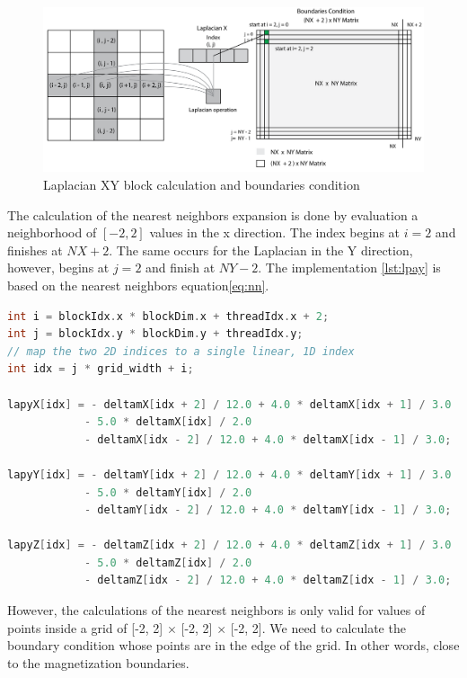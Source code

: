 \begin{figure}[htbp]
	\centering
		\includegraphics[width=1.0\textwidth]{Figures/laplacian.png}
		\smallskip
	\caption[Laplacian block calculation]{Laplacian XY block calculation and boundaries condition}
	\label{fig:laplacian}
\end{figure}

The calculation of the nearest neighbors expansion is done by evaluation a neighborhood of $[-2, 2]$ values in the x direction. The index begins at $i = 2$ and finishes at $NX + 2$. The same occurs for the Laplacian in the Y direction, however, begins at $j = 2$ and finish at $NY -2$.  The implementation \ref{lst:lpay} is based on the nearest neighbors equation\ref{eq:nn}.

\begin{lstlisting}[language=C++, label={lst:lpay}, caption={Laplacian evaluation for x, y and z coordinate}]
int i = blockIdx.x * blockDim.x + threadIdx.x + 2;
int j = blockIdx.y * blockDim.y + threadIdx.y;
// map the two 2D indices to a single linear, 1D index
int idx = j * grid_width + i;

lapyX[idx] = - deltamX[idx + 2] / 12.0 + 4.0 * deltamX[idx + 1] / 3.0
			- 5.0 * deltamX[idx] / 2.0
			- deltamX[idx - 2] / 12.0 + 4.0 * deltamX[idx - 1] / 3.0;	
			
lapyY[idx] = - deltamY[idx + 2] / 12.0 + 4.0 * deltamY[idx + 1] / 3.0
			- 5.0 * deltamY[idx] / 2.0
			- deltamY[idx - 2] / 12.0 + 4.0 * deltamY[idx - 1] / 3.0;	
			
lapyZ[idx] = - deltamZ[idx + 2] / 12.0 + 4.0 * deltamZ[idx + 1] / 3.0
			- 5.0 * deltamZ[idx] / 2.0
			- deltamZ[idx - 2] / 12.0 + 4.0 * deltamZ[idx - 1] / 3.0;	
\end{lstlisting}


However, the calculations of the nearest neighbors is only valid for values of points inside a grid of [-2, 2] $\times$ [-2, 2] $\times$ [-2, 2]. We need to calculate the boundary condition whose points are in the edge of the grid. In other words, close to the magnetization boundaries.

